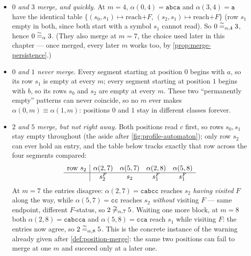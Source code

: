 \begin{example}
\begin{itemize}[nosep]
  \item \emph{$0$ and $3$ merge, and quickly.}  At $m=4$,
        $\alpha(0,4)=\mathtt{abca}$ and $\alpha(3,4)=\mathtt{a}$ have
        the identical table $\{(s_0,s_1)\mapsto\text{reach+}F,\,
        (s_2,s_1)\mapsto\text{reach+}F\}$ (row $s_1$ empty in both,
        since both start with a symbol $s_1$ cannot read).  So
        $0\mathrel{\overset{\sim}{=}_{\alpha,4}}3$, hence $0\mathrel{\overset{\sim}{=}_{\alpha}}3$.  (They
        also merge at $m=7$, the choice used later in this chapter ---
        once merged, every later $m$ works too, by
        \cref{prop:merge-persistence}.)
  \item \emph{$0$ and $1$ never merge.}  Every segment starting at
        position $0$ begins with $a$, so its row $s_1$ is empty at
        every $m$; every segment starting at position $1$ begins with
        $b$, so its rows $s_0$ and $s_2$ are empty at every $m$.  These
        two ``permanently empty'' patterns can never coincide, so no
        $m$ ever makes $\alpha(0,m)\equiv\alpha(1,m)$: positions $0$
        and $1$ stay in different classes forever.
  \item \emph{$2$ and $5$ merge, but not right away.}  Both positions
        read $c$ first, so rows $s_0,s_1$ stay empty throughout
        (the aside after \cref{fig:profile-automaton}); only row $s_2$
        can ever hold an entry, and the table below tracks exactly that
        row across the four segments compared:
        \[
        \begin{array}{c|cccc}
          \text{row }s_2 & \alpha(2,7) & \alpha(5,7) & \alpha(2,8) & \alpha(5,8) \\ \hline
                         & s_2^F        & s_2         & s_1^F        & s_1^F
        \end{array}
        \]
        At $m=7$ the entries disagree: $\alpha(2,7)=\mathtt{cabcc}$
        reaches $s_2$ \emph{having visited} $F$ along the way, while
        $\alpha(5,7)=\mathtt{cc}$ reaches $s_2$ \emph{without} visiting
        $F$ --- same endpoint, different $F$-status, so
        $2\not\mathrel{\overset{\sim}{=}_{\alpha,7}}5$.  Waiting one more block, at $m=8$
        both $\alpha(2,8)=\mathtt{cabcca}$ and $\alpha(5,8)=\mathtt{cca}$
        reach $s_1$ while visiting $F$: the entries now agree, so
        $2\mathrel{\overset{\sim}{=}_{\alpha,8}}5$.  This is the concrete instance of the
        warning already given after \cref{def:position-merge}: the same
        two positions can fail to merge at one $m$ and succeed only at
        a later one.
\end{itemize}


\end{example}
